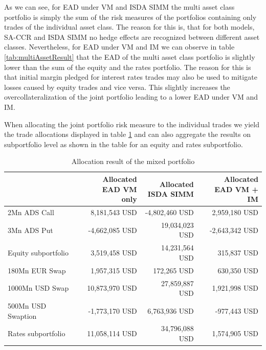 \documentclass[../Thesis_AHoecherl.tex]{subfiles}
\begin{document}
    As we can see, for \gls{EAD} under \gls{VM} and \gls{ISDA SIMM} the multi asset class portfolio is simply the sum of the risk measures of the portfolios containing only trades of the individual asset class.
    The reason for this is, that for both models, \gls{SA-CCR} and \gls{ISDA SIMM} no hedge effects are recognized between different asset classes.
    Nevertheless, for \gls{EAD} under \gls{VM} and \gls{IM} we can observe in table \ref{tab:multiAssetResult} that the \gls{EAD} of the multi asset class portfolio is slightly lower than the sum of the equity and the rates portfolio. 
    The reason for this is that initial margin pledged for interest rates trades may also be used to mitigate losses caused by equity trades and vice versa. This slightly increases the overcollateralization of the joint portfolio leading to a lower \gls{EAD} under \gls{VM} and IM.

    When allocating the joint portfolio risk measure to the individual trades we yield the trade allocations displayed in table \ref{tab:multiAssetAllocation} and can also aggregate the results on subportfolio level as shown in the table for an equity and rates subportfolio.

    \begin{table}[htbp]
        \centering
        \begin{tabular}{l||r|r|r}
                & \makecell{Allocated \\ \gls{EAD} \gls{VM} only} &\makecell{Allocated \\ \gls{ISDA SIMM}} & \makecell{Allocated \\\gls{EAD} \gls{VM} + \gls{IM}} \\
                \toprule
        2Mn ADS Call & 8,181,543 USD & -4,802,460 USD & 2,959,180 USD \\
        3Mn ADS Put & -4,662,085 USD & 19,034,023 USD & -2,643,342 USD \\
        \midrule
        Equity subportfolio & 3,519,458 USD & 14,231,564 USD & 315,837 USD \\
        \toprule
        180Mn EUR Swap & 1,957,315 USD & 172,265 USD & 630,350 USD \\
        1000Mn USD Swap & 10,873,970 USD & 27,859,887 USD & 1,921,998 USD \\
        500Mn USD Swaption & -1,773,170 USD & 6,763,936 USD & -977,443 USD \\
        \midrule
        Rates subportfolio & 11,058,114 USD & 34,796,088 USD & 1,574,905 USD \\
        \end{tabular}%
        \caption{Allocation result of the mixed portfolio}
        \label{tab:multiAssetAllocation}%
    \end{table}%
\end{document}
